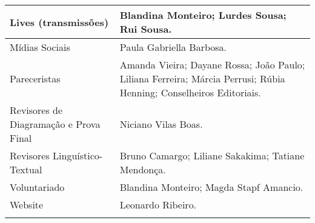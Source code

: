 \documentclass{gescons}
\begin{document}
\begin{longtable}[]{@{}
  >{\raggedright\arraybackslash}p{}
  >{\raggedright\arraybackslash}p{}@{}}
\hline
\begin{minipage}[b]{\linewidth}\raggedright
Lives (transmissões)
\end{minipage} & \begin{minipage}[b]{\linewidth}\raggedright
Blandina Monteiro; Lurdes Sousa; Rui Sousa.
\end{minipage} \\
\hline
\begin{minipage}[b]{\linewidth}\raggedright
Mídias Sociais
\end{minipage} & \begin{minipage}[b]{\linewidth}\raggedright
Paula Gabriella Barbosa.
\end{minipage} \\
\hline
\begin{minipage}[b]{\linewidth}\raggedright
Pareceristas
\end{minipage} & \begin{minipage}[b]{\linewidth}\raggedright
Amanda Vieira; Dayane Rossa; João Paulo; Liliana Ferreira; Márcia Perrusi; Rúbia Henning; Conselheiros Editoriais.
\end{minipage} \\
\hline
\begin{minipage}[b]{\linewidth}\raggedright
Revisores de Diagramação e Prova Final
\end{minipage} & \begin{minipage}[b]{\linewidth}\raggedright
Niciano Vilas Boas.
\end{minipage} \\
\hline
\begin{minipage}[b]{\linewidth}\raggedright
Revisores Linguístico-Textual
\end{minipage} & \begin{minipage}[b]{\linewidth}\raggedright
Bruno Camargo; Liliane Sakakima; Tatiane Mendonça.
\end{minipage} \\
\hline
\begin{minipage}[b]{\linewidth}\raggedright
Voluntariado
\end{minipage} & \begin{minipage}[b]{\linewidth}\raggedright
Blandina Monteiro; Magda Stapf Amancio.
\end{minipage} \\
\hline
\begin{minipage}[b]{\linewidth}\raggedright
Website
\end{minipage} & \begin{minipage}[b]{\linewidth}\raggedright
Leonardo Ribeiro.
\end{minipage} \\
\midrule\noalign{}
\endhead
\bottomrule\noalign{}
\endlastfoot
\end{longtable}


        
\end{document}
